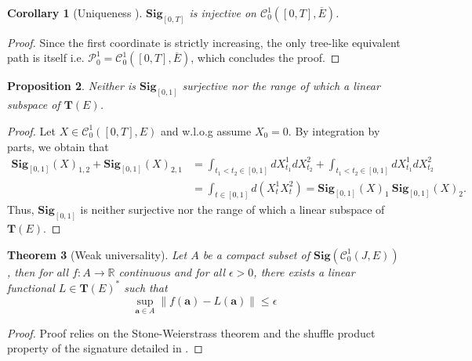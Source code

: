 \documentclass[12pt]{report}
\newtheorem{theorem}{Theorem}[chapter]
\newtheorem{corollary}[theorem]{Corollary}
\newtheorem{proposition}[theorem]{Proposition}
\theoremstyle{definition}
\theoremstyle{remark}
\newcommand{\R}{\mathbb{R}}
\begin{document}
\begin{corollary}[Uniqueness \cite{boedihardjo2016signature}] 
  $\mathbf{Sig}_{[0,T]}$ is injective on $\mathcal{C}^{1}_{0}([0,T],\overline{E})$.
\end{corollary}
\begin{proof}
  Since the first coordinate is strictly increasing, the only tree-like equivalent path is itself i.e. $\mathcal{P}^{1}_{0} = \mathcal{C}^{1}_{0}([0,T],\overline{E})$, which concludes the proof. 
\end{proof}
\begin{proposition}\label{surjective}
  Neither is $\mathbf{Sig}_{[0,1]}$ surjective nor the range of which a linear subspace of $\mathbf{T}(E)$.
\end{proposition}
\begin{proof}
  Let $X \in \mathcal{C}^{1}_{0}([0,T],E)$ and w.l.o.g assume $X_{0} = 0$. 
  By integration by parts, we obtain that 
  \begin{equation}
    \begin{split}
      \mathbf{Sig}_{[0,1]}(X)_{1,2} + \mathbf{Sig}_{[0,1]}(X)_{2,1} &=  \int_{t_{1}<t_{2} \in [0,1]}dX_{t_{1}}^{1}dX_{t_{2}}^{2} + \int_{t_{1}<t_{2} \in [0,1]}dX_{t_{1}}^{1}dX_{t_{2}}^{2}\\
      &=  \int_{t \in [0,1]}d(X_{t}^{1}X_{t}^{2}) = \mathbf{Sig}_{[0,1]}(X)_{1}~\mathbf{Sig}_{[0,1]}(X)_{2}.
    \end{split}
  \end{equation}
  Thus, $\mathbf{Sig}_{[0,1]}$ is neither surjective nor the range of which a linear subspace of $\mathbf{T}(E)$.
\end{proof}

\begin{theorem}[Weak universality]\label{weakuniversality}
  Let $A$ be a compact subset of $\mathbf{Sig}(\mathcal{C}^{1}_{0}(J,E))$, then for all $f \colon A \to \R$ continuous and for all $\epsilon > 0$, there exists a linear functional $L \in \mathbf{T}(E)^{*}$ such that 
  \begin{equation}
    \sup_{\mathbf{a}\in A}\lVert f(\mathbf{a}) - L(\mathbf{a})\rVert \leq \epsilon
  \end{equation}
\end{theorem}
\begin{proof}
  Proof relies on the Stone-Weierstrass theorem and the shuffle product property of the signature detailed in \cite{liao2019learning}.
\end{proof}
\end{document}
